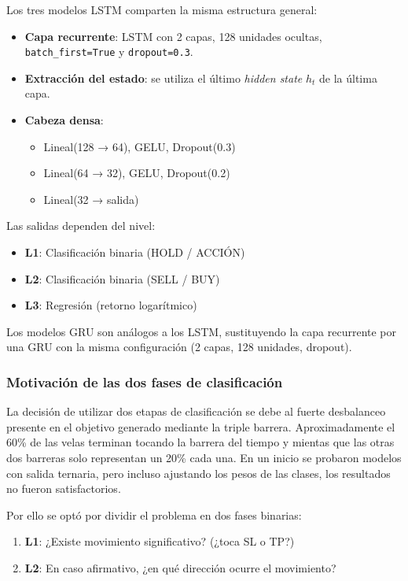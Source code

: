 Los tres modelos LSTM comparten la misma estructura general:

\begin{itemize}
    \item \textbf{Capa recurrente}: LSTM con 2 capas, 128 unidades ocultas, \texttt{batch\_first=True} y \texttt{dropout=0.3}.
    \item \textbf{Extracción del estado}: se utiliza el último \textit{hidden state} $h_{t}$ de la última capa.
    \item \textbf{Cabeza densa}:
    \begin{itemize}
        \item Lineal(128 → 64), GELU, Dropout(0.3)
        \item Lineal(64 → 32), GELU, Dropout(0.2)
        \item Lineal(32 → salida)
    \end{itemize}
\end{itemize}

Las salidas dependen del nivel:
\begin{itemize}
    \item \textbf{L1}: Clasificación binaria (HOLD / ACCIÓN)
    \item \textbf{L2}: Clasificación binaria (SELL / BUY)
    \item \textbf{L3}: Regresión (retorno logarítmico)
\end{itemize}

Los modelos GRU son análogos a los LSTM, sustituyendo la capa recurrente por una GRU con la misma configuración (2 capas, 128 unidades, dropout).

\subsubsection{Motivación de las dos fases de clasificación}

La decisión de utilizar dos etapas de clasificación se debe al fuerte desbalanceo presente en el objetivo generado mediante la triple barrera.
Aproximadamente el 60\% de las velas terminan tocando la barrera del tiempo y mientas que las otras dos barreras solo representan un 20\% cada una. En
un inicio se probaron modelos con salida ternaria, pero incluso ajustando los pesos de las clases, los resultados no fueron satisfactorios.

Por ello se optó por dividir el problema en dos fases binarias:
\begin{enumerate}
    \item \textbf{L1}: ¿Existe movimiento significativo? (¿toca SL o TP?)
    \item \textbf{L2}: En caso afirmativo, ¿en qué dirección ocurre el movimiento?
\end{enumerate}

